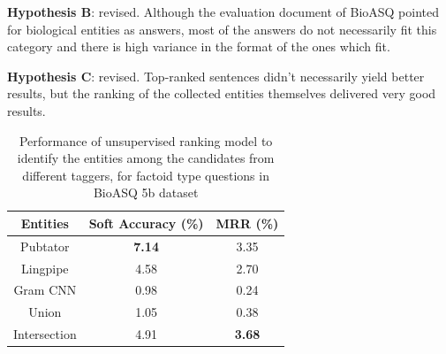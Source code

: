 \bigbreak 

\textbf{Hypothesis B}: revised. Although the evaluation document of BioASQ pointed for biological entities as answers, most of the answers do not necessarily fit this category and there is high variance in the format of the ones which fit.

\bigbreak 

\textbf{Hypothesis C}: revised. Top-ranked sentences didn’t necessarily yield better results, but the ranking of the collected entities themselves delivered very good results.




\begin{table}[t!]
    \centering
    \begin{tabular}{ccc} \hline
    Entities & Soft Accuracy (\%) & MRR (\%) \\ \hline
    Pubtator & \textbf{7.14} & 3.35 \\
    Lingpipe & 4.58 & 2.70 \\
    Gram CNN & 0.98 & 0.24 \\
    Union    & 1.05 & 0.38 \\
    Intersection & 4.91 & \textbf{3.68} \\ \hline
    \end{tabular}
    \caption{Performance of unsupervised ranking model to identify the entities among the candidates from different taggers, for factoid type questions in BioASQ 5b dataset}
    \label{tab:my_label}
\end{table}


